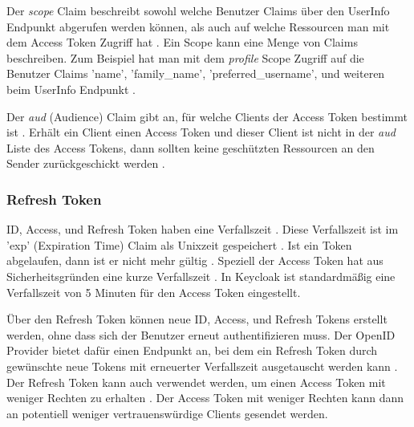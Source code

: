 Der \textit{scope} Claim beschreibt sowohl welche Benutzer Claims über den UserInfo Endpunkt abgerufen werden können, als auch auf welche Ressourcen man mit dem Access Token Zugriff hat \cite{EB11} \cite{EB7}. Ein Scope kann eine Menge von Claims beschreiben. Zum Beispiel hat man mit dem \textit{profile} Scope Zugriff auf die Benutzer Claims 'name', 'family\_name', 'preferred\_username', und weiteren beim UserInfo Endpunkt \cite{EB11}. 

Der \textit{aud} (Audience) Claim gibt an, für welche Clients der Access Token bestimmt ist \cite{EB58}. Erhält ein Client einen Access Token und dieser Client ist nicht in der \textit{aud} Liste des Access Tokens, dann sollten keine geschützten Ressourcen an den Sender zurückgeschickt werden \cite{EB59}.


\subsubsection{Refresh Token}

ID, Access, und Refresh Token haben eine Verfallszeit \cite{EB60} \cite{EB58}. Diese Verfallszeit ist im 'exp' (Expiration Time) Claim als Unixzeit gespeichert \cite{EB60}. Ist ein Token abgelaufen, dann ist er nicht mehr gültig \cite{EB60}. Speziell der Access Token hat aus Sicherheitsgründen eine kurze Verfallszeit \cite{EB61}. In Keycloak ist standardmäßig eine Verfallszeit von 5 Minuten für den Access Token eingestellt.

Über den Refresh Token können neue ID, Access, und Refresh Tokens erstellt werden, ohne dass sich der Benutzer erneut authentifizieren muss. Der OpenID Provider bietet dafür einen Endpunkt an, bei dem ein Refresh Token durch gewünschte neue Tokens mit erneuerter Verfallszeit ausgetauscht werden kann \cite{EB62}. Der Refresh Token kann auch verwendet werden, um einen Access Token mit weniger Rechten zu erhalten \cite{EB12}. Der Access Token mit weniger Rechten kann dann an potentiell weniger vertrauenswürdige Clients gesendet werden.

